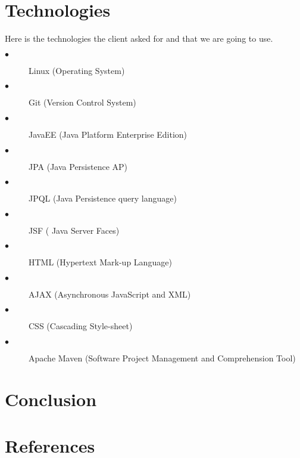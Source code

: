 \documentclass[hidelinks, 12pt]{article}
\begin{document}
\section{Technologies}
Here is the technologies the client asked for and that we are going to use.
\begin{description}
  \item[$\bullet$] Linux (Operating System)
  \item[$\bullet$] Git (Version Control System)
  \item[$\bullet$] JavaEE (Java Platform Enterprise Edition)
  \item[$\bullet$] JPA (Java Persistence AP)
  \item[$\bullet$] JPQL (Java Persistence query language)
  \item[$\bullet$] JSF ( Java Server Faces)
  \item[$\bullet$] HTML (Hypertext Mark-up Language)
  \item[$\bullet$] AJAX (Asynchronous JavaScript and XML)
  \item[$\bullet$] CSS (Cascading Style-sheet)
  \item[$\bullet$] Apache Maven (Software Project Management and Comprehension Tool)

\end{description}
\section{Conclusion}

\section{References}
\end{document}
